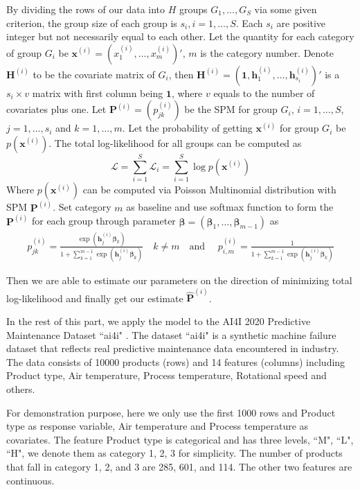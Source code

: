 \documentclass[12pt]{article}
\newcommand{\loglik}{\mathcal{L}}
\newcommand{\onevec}{{\boldsymbol{1}}}
\newcommand{\betavec}{{\boldsymbol{\beta}}}
\newcommand{\Pmat}{\mathbf{P}}
\newcommand{\Hmat}{\mathbf{H}}
\newcommand{\wh}{\widehat}
\newcommand{\xvec}{\boldsymbol{x}}
\newcommand{\hvec}{\boldsymbol{h}}
\begin{document}
By dividing the rows of our data into $H$ groups $G_1,\dots,G_{S}$ via some given criterion, the group size of each group is $s_i,i=1,\dots,S$. Each $s_i$ are positive integer but not necessarily equal to each other. Let the quantity for each category of group $G_i$ be $\xvec^{(i)} = (x_1^{(i)}, \dots, x_m^{(i)})'$, $m$ is the category number. Denote $\Hmat^{(i)}$ to be the covariate matrix of $G_i$, then $\Hmat^{(i)} = (\onevec, \hvec_{1}^{(i)},\dots,\hvec_{s_i}^{(i)})'$ is a $s_i \times v$ matrix with first column being $\onevec$, where $v$ equals to the number of covariates plus one. Let $\Pmat^{(i)} = (p_{jk}^{(i)})$ be the SPM for group $G_i$, $i = 1, \dots, S$, $j = 1,\dots ,s_i$ and $k = 1,\dots, m$. Let the probability of getting $\xvec^{(i)}$ for group $G_i$ be $p(\xvec^{(i)})$. The total log-likelihood for all groups can be computed as
\begin{equation*}
\loglik = \sum_{i=1}^{S}\loglik_i = \sum_{i=1}^{S}\log p(\xvec^{(i)})
\end{equation*}
Where $p(\xvec^{(i)})$ can be computed via Poisson Multinomial distribution with SPM $\Pmat^{(i)}$. Set category $m$ as baseline and use softmax function to form the $\Pmat^{(i)}$ for each group through parameter $\betavec = (\betavec_1, \dots, \betavec_{m-1})$ as
\begin{align*}
    p_{j k}^{(i)} = \frac{\exp{\left(\hvec_{j}^{(i)} \betavec_{k}\right)}}{1 + \sum_{k=1}^{m-1}\exp{\left( \hvec_{j}^{(i)} \betavec_{k} \right)}}
    \quad k \neq m \quad \text{and } \quad
    p_{i,m}^{(i)} = \frac{1}{1 + \sum_{k=1}^{m-1}\exp{\left( \hvec_{j}^{(i)} \betavec_{k} \right)}}
\end{align*}

Then we are able to estimate our parameters on the direction of minimizing total log-likelihood and finally get our estimate $\wh{\Pmat}^{(i)}$.

In the rest of this part, we apply the model to the 
AI4I 2020 Predictive Maintenance Dataset ``ai4i"  \cite{Dua:2019}. The dataset ``ai4i" is a synthetic machine failure dataset that reflects real predictive maintenance data encountered in industry. The data consists of 10000 products (rows) and 14 features (columns) including Product type, Air temperature, Process temperature, Rotational speed and others.

For demonstration purpose, here we only use the first 1000 rows and Product type as response variable, Air temperature and Process temperature as covariates. The feature Product type is categorical and has three levels, ``M", ``L", ``H", we denote them as category 1, 2, 3 for simplicity. The number of products that fall in category 1, 2, and 3 are 285, 601, and 114. The other two features are continuous.
\end{document}
